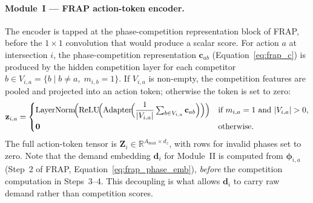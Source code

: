\paragraph{Module~I — FRAP action-token encoder.}
The encoder is tapped at the phase-competition representation block of FRAP, before the $1{\times}1$ convolution that would produce a scalar score. For action $a$ at intersection $i$, the phase-competition representation $\mathbf{c}_{ab}$ (Equation~\ref{eq:frap_c}) is produced by the hidden competition layer for each competitor $b \in V_{i,a} = \{b \mid b \neq a,\; m_{i,b} = 1\}$. If $V_{i,a}$ is non-empty, the competition features are pooled and projected into an action token; otherwise the token is set to zero:
\begin{equation}
  \mathbf{z}_{i,a} =
  \begin{cases}
    \operatorname{LayerNorm}\!\Bigl(
      \operatorname{ReLU}\!\Bigl(
        \operatorname{Adapter}\!\Bigl(
          \dfrac{1}{|V_{i,a}|}\sum_{b \in V_{i,a}} \mathbf{c}_{ab}
        \Bigr)
      \Bigr)
    \Bigr) & \text{if } m_{i,a}=1 \text{ and } |V_{i,a}|>0, \\[6pt]
    \mathbf{0} & \text{otherwise.}
  \end{cases}
  \label{eq:fgsv2_token}
\end{equation}
The full action-token tensor is $\mathbf{Z}_i \in \mathbb{R}^{A_{\max} \times d_z}$, with rows for invalid phases set to zero. Note that the demand embedding $\mathbf{d}_i$ for Module~II is computed from $\boldsymbol{\phi}_{i,a}$ (Step~2 of FRAP, Equation~\ref{eq:frap_phase_emb}), \emph{before} the competition computation in Steps~3--4. This decoupling is what allows $\mathbf{d}_i$ to carry raw demand rather than competition scores.

